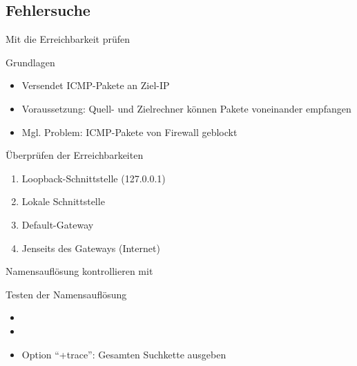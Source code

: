 \documentclass[aspectratio=43]{beamer}
\begin{document}
\subsection{Fehlersuche}

\begin{frame}{Mit  die Erreichbarkeit prüfen}
  \begin{block}{Grundlagen}
    \begin{itemize}
      \item Versendet ICMP-Pakete an Ziel-IP
      \item Voraussetzung: Quell- und Zielrechner können Pakete voneinander empfangen
      \item Mgl. Problem: ICMP-Pakete von Firewall geblockt
    \end{itemize}
  \end{block}
  \begin{block}{Überprüfen der Erreichbarkeiten}
    \begin{enumerate}
      \item Loopback-Schnittstelle (127.0.0.1)
      \item Lokale Schnittstelle
      \item Default-Gateway
      \item Jenseits des Gateways (Internet)
    \end{enumerate}
  \end{block}
\end{frame}

\begin{frame}{Namensauflösung kontrollieren mit }
  \begin{block}{Testen der Namensauflösung}
    \begin{itemize}
      \item {}
      \item {}
      \item Option ``+trace'': Gesamten Suchkette ausgeben
    \end{itemize}
  \end{block}
\end{frame}
\end{document}
